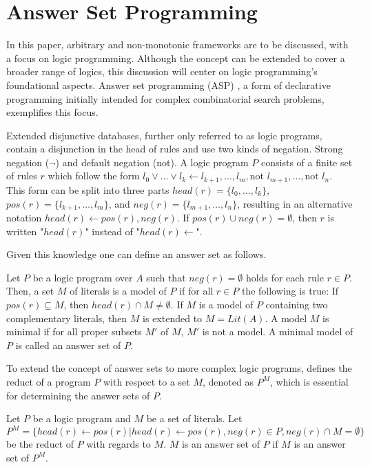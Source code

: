 \section{Answer Set Programming}
In this paper, arbitrary and non-monotonic frameworks are to be discussed, with a focus on logic programming. Although the concept can be extended to cover a broader range of logics, this discussion will center on logic programming's foundational aspects. Answer set programming (ASP) \cite{gelfond_logic_2002}, a form of declarative programming initially intended for complex combinatorial search problems, exemplifies this focus.

Extended disjunctive databases, further only referred to as logic programs, contain a disjunction in the head of rules and use two kinds of negation. Strong negation (\(\neg\)) and default negation (not). A logic program \(P\) consists of a finite set of rules \(r\) which follow the form \(l_0 \lor \dots \lor l_k \leftarrow l_{k+1}, \dots, l_m, \text{not } l_{m+1}, \dots, \text{not }l_n\). This form can be split into three parts \(head(r) = \{l_0, \dots, l_k\}\), \(pos(r) = \{l_{k+1}, \dots, l_m\}\), and \(neg(r) = \{l_{m+1}, \dots, l_n\}\), resulting in an alternative notation \(head(r) \leftarrow pos(r), neg(r)\). If \(pos(r) \cup neg(r) = \emptyset\), then \(r\) is written "\(head(r)\)" instead of "\(head(r) \leftarrow\)".

Given this knowledge one can define an answer set as follows.

\begin{definition}
    Let \(P\) be a logic program over \(A\) such that \(neg(r) = \emptyset\) holds for each rule \(r \in P\). Then, a set \(M\) of literals is a model of \(P\) if for all \(r \in P\) the following is true: If \(pos(r) \subseteq M\), then \(head(r) \cap M \neq \emptyset\). If \(M\) is a model of \(P\) containing two complementary literals, then \(M\) is extended to \(M = Lit(A)\). A model \(M\) is minimal if for all proper subsets \(M'\) of \(M\), \(M'\) is not a model. A minimal model of \(P\) is called an answer set of \(P\).
\end{definition}

To extend the concept of answer sets to more complex logic programs, \cite{gelfond_classical_1991} defines the reduct of a program \(P\) with respect to a set \(M\), denoted as \(P^M\), which is essential for determining the answer sets of \(P\).

\begin{definition}
    Let \(P\) be a logic program and \(M\) be a set of literals. Let \[P^M = \{head(r) \leftarrow pos(r) | head(r) \leftarrow pos(r), neg(r) \in P, neg(r) \cap M = \emptyset\}\] be the reduct of \(P\) with regards to \(M\). \(M\) is an answer set of \(P\) if \(M\) is an answer set of \(P^M\).
\end{definition}

